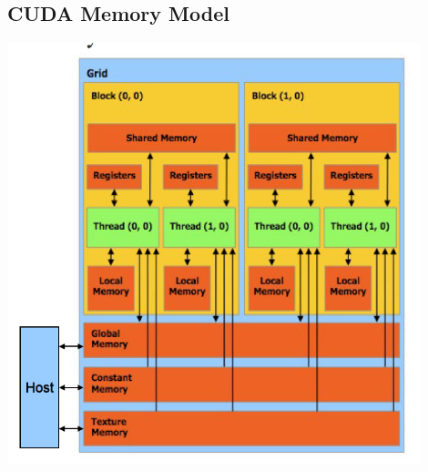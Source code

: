 \documentclass{article}
\begin{document}
\subsection{CUDA Memory Model}
\includegraphics[width=0.9\textwidth]{l6_cuda_memory_model.png}
\end{document}
